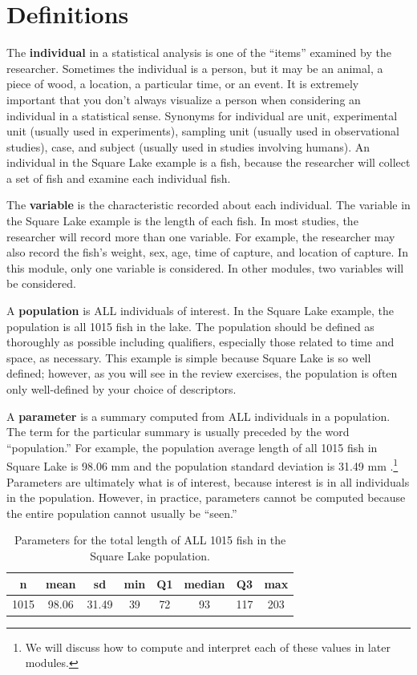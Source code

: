 \documentclass[10pt,openany]{book}\usepackage[]{graphicx}\usepackage[]{color}
\begin{document}
\section{Definitions} \label{sect:IVPPSS}
\vspace{-12pt}
The \textbf{individual} in a statistical analysis is one of the ``items'' examined by the researcher.  Sometimes the individual is a person, but it may be an animal, a piece of wood, a location, a particular time, or an event. It is extremely important that you don't always visualize a person when considering an individual in a statistical sense. Synonyms for individual are unit, experimental unit (usually used in experiments), sampling unit (usually used in observational studies), case, and subject (usually used in studies involving humans). An individual in the Square Lake example is a fish, because the researcher will collect a set of fish and examine each individual fish.

The \textbf{variable} is the characteristic recorded about each individual. The variable in the Square Lake example is the length of each fish. In most studies, the researcher will record more than one variable. For example, the researcher may also record the fish's weight, sex, age, time of capture, and location of capture. In this module, only one variable is considered. In other modules, two variables will be considered.

A \textbf{population} is ALL individuals of interest. In the Square Lake example, the population is all 1015 fish in the lake. The population should be defined as thoroughly as possible including qualifiers, especially those related to time and space, as necessary. This example is simple because Square Lake is so well defined; however, as you will see in the review exercises, the population is often only well-defined by your choice of descriptors.

A \textbf{parameter} is a summary computed from ALL individuals in a population.  The term for the particular summary is usually preceded by the word ``population.'' For example, the population average length of all 1015 fish in Square Lake is 98.06 mm and the population standard deviation is 31.49 mm .\footnote{We will discuss how to compute and interpret each of these values in later modules.} Parameters are ultimately what is of interest, because interest is in all individuals in the population. However, in practice, parameters cannot be computed because the entire population cannot usually be ``seen.''
\begin{table}[ht]
\centering
\caption{Parameters for the total length of ALL 1015 fish in the Square Lake population.} 
\label{tab:SquareLakePopn}
\begin{tabular}{cccccccc}
 n & mean & sd & min & Q1 & median & Q3 & max \\ 
  \hline
1015 & 98.06 & 31.49 & 39 & 72 & 93 & 117 & 203 \\ 
   \hline
\end{tabular}
\end{table}
\end{document}
